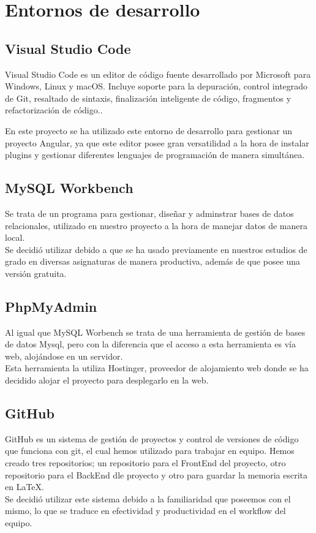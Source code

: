      \section{Entornos de desarrollo}
     \subsection{Visual Studio Code}
     Visual Studio Code es un editor de código fuente desarrollado por Microsoft para Windows, Linux y macOS. Incluye soporte para la depuración, control integrado de Git, resaltado de sintaxis, finalización inteligente de código, fragmentos y refactorización de código.\cite{vsc}.
    \newline
    
    En este proyecto se ha utilizado este entorno de desarrollo para gestionar un proyecto Angular, ya que este editor posee gran versatilidad a la hora de instalar plugins y gestionar diferentes lenguajes de programación de manera simultánea.
    
     \subsection{MySQL Workbench}
     Se trata de un programa para gestionar, diseñar y adminstrar bases de datos relacionales, utilizado en nuestro proyecto a la hora de manejar datos de manera local. \\
     \newline
     Se decidió utilizar debido a que se ha usado previamente en nuestros estudios de grado en diversas asignaturas de manera productiva, además de que posee una versión gratuita.
     
     \subsection{PhpMyAdmin}
     Al igual que MySQL Worbench se trata de una herramienta de gestión de bases de datos Mysql, pero con la diferencia que el acceso a esta herramienta es vía web, alojándose en un servidor.\\
     \newline
     Esta herramienta la utiliza Hostinger\cite{hostinger},  proveedor de alojamiento web donde se ha decidido alojar el proyecto para desplegarlo en la web.
     
     \subsection{GitHub}
     GitHub es un sistema de gestión de proyectos y control de versiones de código que funciona con git, el cual hemos utilizado para trabajar en equipo. Hemos creado tres repositorios; un repositorio para el FrontEnd del proyecto, otro repositorio para el BackEnd dle proyecto y otro para guardar la memoria escrita en \LaTeX . \\
     \newline
     Se decidió utilizar este sistema debido a la familiaridad que poseemos con el mismo, lo que se traduce en efectividad y productividad en el workflow del equipo.

